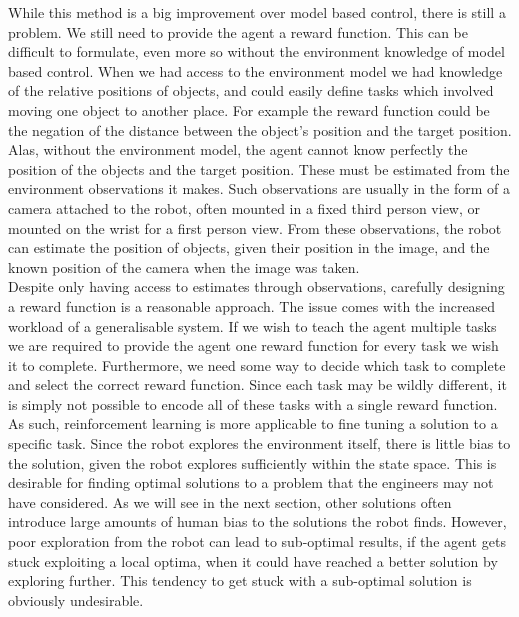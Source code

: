 While this method is a big improvement over model based control, there is still a problem. We still need to provide the agent a reward function. This can be difficult to formulate, even more so without the environment knowledge of model based control. When we had access to the environment model we had knowledge of the relative positions of objects, and could easily define tasks which involved moving one object to another place. For example the reward function could be the negation of the distance between the object's position and the target position. Alas, without the environment model, the agent cannot know perfectly the position of the objects and the target position. These must be estimated from the environment observations it makes. Such observations are usually in the form of a camera attached to the robot, often mounted in a fixed third person view, or mounted on the wrist for a first person view. From these observations, the robot can estimate the position of objects, given their position in the image, and the known position of the camera when the image was taken.
\\
Despite only having access to estimates through observations, carefully designing a reward function is a reasonable approach. The issue comes with the increased workload of a generalisable system. If we wish to teach the agent multiple tasks we are required to provide the agent one reward function for every task we wish it to complete. Furthermore, we need some way to decide which task to complete and select the correct reward function. Since each task may be wildly different, it is simply not possible to encode all of these tasks with a single reward function. As such, reinforcement learning is more applicable to fine tuning a solution to a specific task. Since the robot explores the environment itself, there is little bias to the solution, given the robot explores sufficiently within the state space. This is desirable for finding optimal solutions to a problem that the engineers may not have considered. As we will see in the next section, other solutions often introduce large amounts of human bias to the solutions the robot finds. However, poor exploration from the robot can lead to sub-optimal results, if the agent gets stuck exploiting a local optima, when it could have reached a better solution by exploring further. This tendency to get stuck with a sub-optimal solution is obviously undesirable. \\

